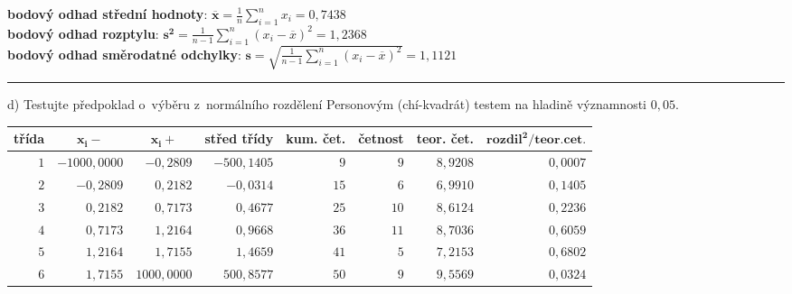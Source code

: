 \documentclass[a4paper, 11pt]{article}
\begin{document}
	\textbf{bodový odhad střední hodnoty}: $ \boldsymbol{\overline{x}} =
	\frac{1}{n} \sum\limits_{i = 1}^n x_i = 0,7438 $ \\
	\textbf{bodový odhad rozptylu}: $ \boldsymbol{s^2} = \frac{1}{n - 1}
	\sum\limits_{i = 1}^n (x_i - \overline{x})^2 = 1,2368 $ \\
	\textbf{bodový odhad směrodatné odchylky}: $ \boldsymbol{s} =
	\sqrt{\frac{1}{n - 1} \sum\limits_{i = 1}^n (x_i - \overline{x})^2} =
	1,1121 $

	\vspace{1em}\noindent\rule{\textwidth}{.5pt}\vspace{1em}

	d) Testujte předpoklad o~výběru z~normálního rozdělení Personovým
	(chí-kvadrát) testem na hladině významnosti $ 0,05 $.
	\vspace{1em}

	\begin{table}[H]
		\centering
		\begin{tabular}{|r|r|r|r|r|r|r|r|}
			\hline
			\multicolumn{1}{|c|}{\textbf{třída}}
			& \multicolumn{1}{c|}{$ \boldsymbol{x_i-} $}
			& \multicolumn{1}{c|}{\textbf{$ \boldsymbol{x_i+} $}}
			& \multicolumn{1}{c|}{\textbf{střed třídy}}
			& \multicolumn{1}{c|}{\textbf{kum. čet.}}
			& \multicolumn{1}{c|}{\textbf{četnost}}
			& \multicolumn{1}{c|}{\textbf{teor. čet.}}
			& \multicolumn{1}{c|}{$ \mathbf{rozdil^2 / teor. cet.} $}
			\\ \hline \hline

			$ 1 $ & $ -1000,0000 $ & $ -0,2809 $ & $ -500,1405 $
			& $ 9 $ & $ 9 $ & $ 8,9208 $ & $ 0,0007 $ \\ \hline

			$ 2 $ & $ -0,2809 $ & $ 0,2182 $ & $ -0,0314 $
			& $ 15 $ & $ 6 $ & $ 6,9910 $ & $ 0,1405 $ \\ \hline

			$ 3 $ & $ 0,2182 $ & $ 0,7173 $ & $ 0,4677 $
			& $ 25 $ & $ 10 $ & $ 8,6124 $ & $ 0,2236 $ \\ \hline

			$ 4 $ & $ 0,7173 $ & $ 1,2164 $ & $ 0,9668 $
			& $ 36 $ & $ 11 $ & $ 8,7036 $ & $ 0,6059 $ \\ \hline

			$ 5 $ & $ 1,2164 $ & $ 1,7155 $ & $ 1,4659 $
			& $ 41 $ & $ 5 $ & $ 7,2153 $ & $ 0,6802 $ \\ \hline

			$ 6 $ & $ 1,7155 $ & $ 1000,0000 $ & $ 500,8577 $
			& $ 50 $ & $ 9 $ & $ 9,5569 $ & $ 0,0324 $ \\ \hline
		\end{tabular}
	\end{table}
\end{document}
